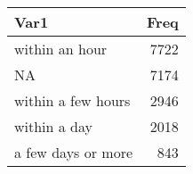 \begin{table}[H]
\centering
\begin{tabular}[t]{lr}
\toprule
Var1 & Freq\\
\midrule
within an hour & 7722\\
NA & 7174\\
within a few hours & 2946\\
within a day & 2018\\
a few days or more & 843\\
\bottomrule
\end{tabular}
\end{table}